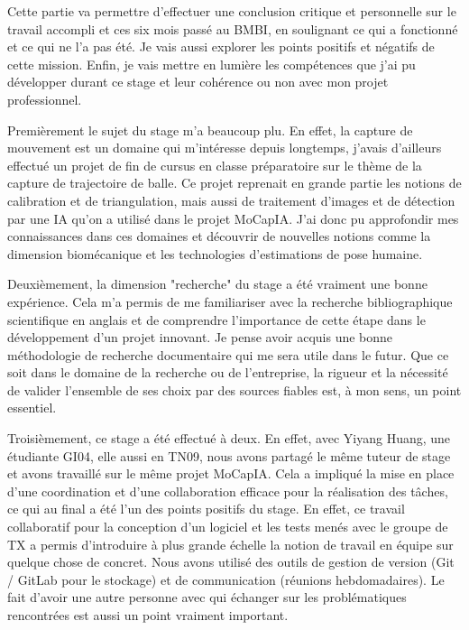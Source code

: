         Cette partie va permettre d'effectuer une conclusion critique et personnelle sur le travail accompli et ces six mois passé au BMBI, en soulignant ce qui a fonctionné et ce qui ne l'a pas été. Je vais aussi explorer les points positifs et négatifs de cette mission. Enfin, je vais mettre en lumière les compétences que j'ai pu développer durant ce stage et leur cohérence ou non avec mon projet professionnel.

        Premièrement le sujet du stage m'a beaucoup plu. En effet, la capture de mouvement est un domaine qui m'intéresse depuis longtemps, j'avais d'ailleurs effectué un projet de fin de cursus en classe préparatoire sur le thème de la capture de trajectoire de balle. Ce projet reprenait en grande partie les notions de calibration et de triangulation, mais aussi de traitement d'images et de détection par une IA qu'on a utilisé dans le projet MoCapIA. J'ai donc pu approfondir mes connaissances dans ces domaines et découvrir de nouvelles notions comme la dimension biomécanique et les technologies d'estimations de pose humaine.

        Deuxièmement, la dimension "recherche" du stage a été vraiment une bonne expérience. Cela m'a permis de me familiariser avec la recherche bibliographique scientifique en anglais et de comprendre l'importance de cette étape dans le développement d'un projet innovant. Je pense avoir acquis une bonne méthodologie de recherche documentaire qui me sera utile dans le futur. Que ce soit dans le domaine de la recherche ou de l'entreprise, la rigueur et la nécessité de valider l'ensemble de ses choix par des sources fiables est, à mon sens, un point essentiel.

        Troisièmement, ce stage a été effectué à deux. En effet, avec Yiyang Huang, une étudiante GI04, elle aussi en TN09, nous avons partagé le même tuteur de stage et avons travaillé sur le même projet MoCapIA. Cela a impliqué la mise en place d'une coordination et d'une collaboration efficace pour la réalisation des tâches, ce qui au final a été l'un des points positifs du stage. En effet, ce travail collaboratif pour la conception d'un logiciel et les tests menés avec le groupe de TX a permis d'introduire à plus grande échelle la notion de travail en équipe sur quelque chose de concret. Nous avons utilisé des outils de gestion de version (Git / GitLab pour le stockage) et de communication (réunions hebdomadaires). Le fait d'avoir une autre personne avec qui échanger sur les problématiques rencontrées est aussi un point vraiment important. 
        
